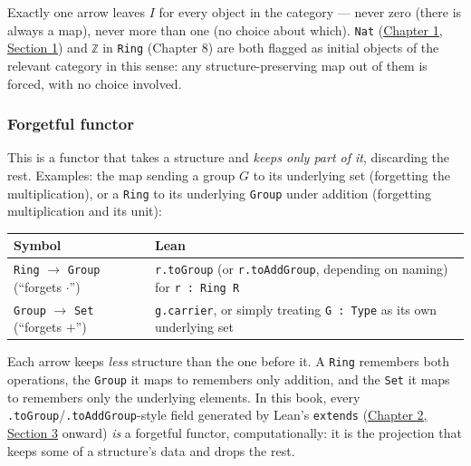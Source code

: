 Exactly one arrow leaves \(I\) for every object in the category --- never zero (there is always a map), never more than one (no choice about which). \texttt{Nat} (\hyperref[sec:01-basics:01-everything-has-a-type:1]{Chapter 1, Section 1}) and \texttt{ℤ} in \texttt{Ring} (Chapter 8) are both flagged as initial objects of the relevant category in this sense: any structure-preserving map out of them is forced, with no choice involved.

\subsubsection{Forgetful functor}\label{sec:01-basics:04-terminology:10}

This is a functor that takes a structure and \emph{keeps only part of it}, discarding the rest. Examples: the map sending a group \(G\) to its underlying set (forgetting the multiplication), or a \texttt{Ring} to its underlying \texttt{Group} under addition (forgetting multiplication and its unit):

\begin{center}

\end{center}

{\small\begin{tabular}{
  >{\raggedright\arraybackslash}p{}
  >{\raggedright\arraybackslash}p{}
}
\toprule
Symbol & Lean \\
\midrule
\texttt{Ring} \(\to\) \texttt{Group} (``forgets \(\cdot\)'') & \texttt{r.toGroup} (or \texttt{r.toAddGroup}, depending on naming) for \texttt{r : Ring R} \\
\texttt{Group} \(\to\) \texttt{Set} (``forgets \(+\)'') & \texttt{g.carrier}, or simply treating \texttt{G : Type} as its own underlying set \\
\bottomrule
\end{tabular}}


Each arrow keeps \emph{less} structure than the one before it. A \texttt{Ring} remembers both operations, the \texttt{Group} it maps to remembers only addition, and the \texttt{Set} it maps to remembers only the underlying elements. In this book, every \texttt{.toGroup}/\texttt{.toAddGroup}-style field generated by Lean's \texttt{extends} (\hyperref[sec:02-functions-and-structures:03-extending-structures:1]{Chapter 2, Section 3} onward) \emph{is} a forgetful functor, computationally: it is the projection that keeps some of a structure's data and drops the rest.

